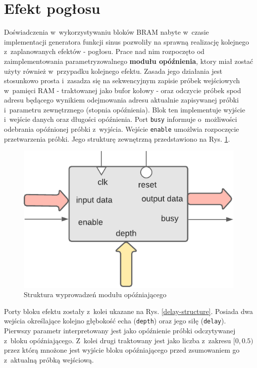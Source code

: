 \section{Efekt pogłosu}

Doświadczenia w~wykorzystywaniu bloków BRAM nabyte w~czasie implementacji generatora funkcji sinus pozwoliły na sprawną realizację kolejnego z~zaplanowanych efektów - pogłosu. Prace nad nim rozpoczęto od zaimplementowania parametryzowalnego \textbf{modułu opóźnienia}, ktory miał zostać użyty również w~przypadku kolejnego efektu. Zasada jego działania jest stosunkowo prosta i~zasadza się na sekwencyjnym zapisie próbek wejściowych w~pamięci RAM - traktowanej jako bufor kołowy - oraz odczycie próbek spod adresu będącego wynikiem odejmowania adresu aktualnie zapisywanej próbki i~parametru zewnętrznego (stopnia opóźnienia). Blok ten implementuje wyjście i~wejście danych oraz długości opóźnienia. Port \verb|busy| informuje o~możliwości odebrania opóźnionej próbki z~wyjścia. Wejście \verb |enable| umożlwia rozpoczęcie przetwarzenia próbki. Jego strukturę zewnętrzną przedstawiono na Rys. \ref{delay-line-structure}.

\vspace{0.5cm}
\begin{figure}[ht]
    \centering
    \includegraphics[scale=0.75]{img/diagrams/delay_line.pdf}
    \captionsetup{format=plain,justification=centering}
    \caption{Struktura wyprowadzeń modułu opóźniającego}
    \label{delay-line-structure}
\end{figure}
\vspace{0.5cm}

Porty bloku efektu zostały z~kolei ukazane na Rys. \ref{delay-structure}. Posiada dwa wejścia określające kolejno głębokość echa (\verb|depth|) oraz jego siłę (\verb|delay|). Pierwszy parametr interpretowany jest jako opóźnienie próbki odczytywanej z~bloku opóźniającego. Z~kolei drugi traktowany jest jako liczba z~zakresu $[0,0.5)$ przez którą mnożone jest wyjście bloku opóźniającego przed zsumowaniem go z~aktualną próbką wejściową.

